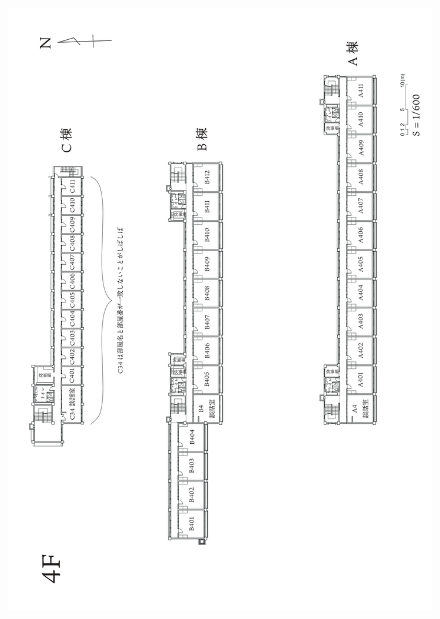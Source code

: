 \newpage
\begin{figure}[bh]
\centering
\includegraphics[]{gazo/熊野寮建物図面_ver.2_page-0005.jpg}
\end{figure}